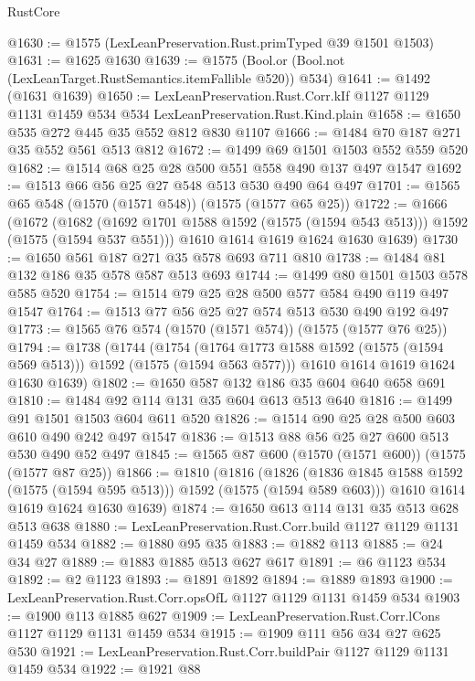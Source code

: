 \begin{lexlean}{RustCore}
\begin{coremodule}
@1630 := @1575 (LexLeanPreservation.Rust.primTyped @39 @1501 @1503)
@1631 := @1625 @1630
@1639 := @1575 (Bool.or (Bool.not (LexLeanTarget.RustSemantics.itemFallible @520)) @534)
@1641 := @1492 (@1631 @1639)
@1650 := LexLeanPreservation.Rust.Corr.kIf
    @1127
    @1129
    @1131
    @1459
    @534
    @534
    LexLeanPreservation.Rust.Kind.plain
@1658 := @1650 @535 @272 @445 @35 @552 @812 @830 @1107
@1666 := @1484 @70 @187 @271 @35 @552 @561 @513 @812
@1672 := @1499 @69 @1501 @1503 @552 @559 @520
@1682 := @1514 @68 @25 @28 @500 @551 @558 @490 @137 @497 @1547
@1692 := @1513 @66 @56 @25 @27 @548 @513 @530 @490 @64 @497
@1701 := @1565 @65 @548 (@1570 (@1571 @548)) (@1575 (@1577 @65 @25))
@1722 := @1666
    (@1672
      (@1682 (@1692 @1701 @1588 @1592 (@1575 (@1594 @543 @513))) @1592 (@1575 (@1594 @537 @551)))
      @1610
      @1614
      @1619
      @1624
      @1630
      @1639)
@1730 := @1650 @561 @187 @271 @35 @578 @693 @711 @810
@1738 := @1484 @81 @132 @186 @35 @578 @587 @513 @693
@1744 := @1499 @80 @1501 @1503 @578 @585 @520
@1754 := @1514 @79 @25 @28 @500 @577 @584 @490 @119 @497 @1547
@1764 := @1513 @77 @56 @25 @27 @574 @513 @530 @490 @192 @497
@1773 := @1565 @76 @574 (@1570 (@1571 @574)) (@1575 (@1577 @76 @25))
@1794 := @1738
    (@1744
      (@1754 (@1764 @1773 @1588 @1592 (@1575 (@1594 @569 @513))) @1592 (@1575 (@1594 @563 @577)))
      @1610
      @1614
      @1619
      @1624
      @1630
      @1639)
@1802 := @1650 @587 @132 @186 @35 @604 @640 @658 @691
@1810 := @1484 @92 @114 @131 @35 @604 @613 @513 @640
@1816 := @1499 @91 @1501 @1503 @604 @611 @520
@1826 := @1514 @90 @25 @28 @500 @603 @610 @490 @242 @497 @1547
@1836 := @1513 @88 @56 @25 @27 @600 @513 @530 @490 @52 @497
@1845 := @1565 @87 @600 (@1570 (@1571 @600)) (@1575 (@1577 @87 @25))
@1866 := @1810
    (@1816
      (@1826 (@1836 @1845 @1588 @1592 (@1575 (@1594 @595 @513))) @1592 (@1575 (@1594 @589 @603)))
      @1610
      @1614
      @1619
      @1624
      @1630
      @1639)
@1874 := @1650 @613 @114 @131 @35 @513 @628 @513 @638
@1880 := LexLeanPreservation.Rust.Corr.build @1127 @1129 @1131 @1459 @534
@1882 := @1880 @95 @35
@1883 := @1882 @113
@1885 := @24 @34 @27
@1889 := @1883 @1885 @513 @627 @617
@1891 := @6 @1123 @534
@1892 := @2 @1123
@1893 := @1891 @1892
@1894 := @1889 @1893
@1900 := LexLeanPreservation.Rust.Corr.opsOfL @1127 @1129 @1131 @1459 @534
@1903 := @1900 @113 @1885 @627
@1909 := LexLeanPreservation.Rust.Corr.lCons @1127 @1129 @1131 @1459 @534
@1915 := @1909 @111 @56 @34 @27 @625 @530
@1921 := LexLeanPreservation.Rust.Corr.buildPair @1127 @1129 @1131 @1459 @534
@1922 := @1921 @88

\end{coremodule}
\end{lexlean}
